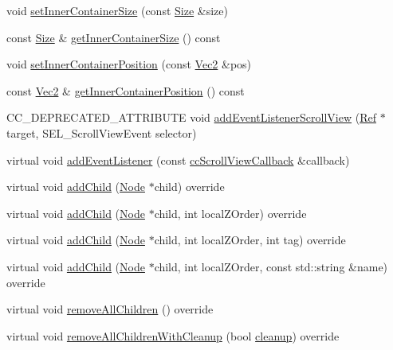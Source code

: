 \begin{DoxyCompactItemize}
\item 
void \hyperlink{classui_1_1ScrollView_a783880c25817f9bf15abc463e34ca413}{set\+Inner\+Container\+Size} (const \hyperlink{classSize}{Size} \&size)
\item 
const \hyperlink{classSize}{Size} \& \hyperlink{classui_1_1ScrollView_aa1767cb627e7d48b7f031e620d44f656}{get\+Inner\+Container\+Size} () const
\item 
void \hyperlink{classui_1_1ScrollView_a137ec6b7e449bebbb80e784965f6a859}{set\+Inner\+Container\+Position} (const \hyperlink{classVec2}{Vec2} \&pos)
\item 
const \hyperlink{classVec2}{Vec2} \& \hyperlink{classui_1_1ScrollView_ab8fdf3e895c799cf9d456c3fc62990a0}{get\+Inner\+Container\+Position} () const
\item 
C\+C\+\_\+\+D\+E\+P\+R\+E\+C\+A\+T\+E\+D\+\_\+\+A\+T\+T\+R\+I\+B\+U\+TE void \hyperlink{classui_1_1ScrollView_accb739c82acfb7dd0db5a33f68519356}{add\+Event\+Listener\+Scroll\+View} (\hyperlink{classRef}{Ref} $\ast$target, S\+E\+L\+\_\+\+Scroll\+View\+Event selector)
\item 
virtual void \hyperlink{classui_1_1ScrollView_ad8aeb3841d9330558f538d4aad679073}{add\+Event\+Listener} (const \hyperlink{classui_1_1ScrollView_ae836cc55536c3cc4f4db5cb99c3c88d5}{cc\+Scroll\+View\+Callback} \&callback)
\item 
virtual void \hyperlink{classui_1_1ScrollView_a6cdee934880e71245c6f5e6a2789c48a}{add\+Child} (\hyperlink{classNode}{Node} $\ast$child) override
\item 
virtual void \hyperlink{classui_1_1ScrollView_a42849e8b7b80ca0bcee880f40de9eccd}{add\+Child} (\hyperlink{classNode}{Node} $\ast$child, int local\+Z\+Order) override
\item 
virtual void \hyperlink{classui_1_1ScrollView_a1843e13af3409763de103e52eb28f3bd}{add\+Child} (\hyperlink{classNode}{Node} $\ast$child, int local\+Z\+Order, int tag) override
\item 
virtual void \hyperlink{classui_1_1ScrollView_a84baef5d2ad68df9c19a73da551a780d}{add\+Child} (\hyperlink{classNode}{Node} $\ast$child, int local\+Z\+Order, const std\+::string \&name) override
\item 
virtual void \hyperlink{classui_1_1ScrollView_aaef2d3ce7b1b7d485af4a3657bea17e5}{remove\+All\+Children} () override
\item 
virtual void \hyperlink{classui_1_1ScrollView_ac71d0fe89be6291abbccf6a6f8f011b4}{remove\+All\+Children\+With\+Cleanup} (bool \hyperlink{classProtectedNode_a5462a6202b458193c1881bcdcc5be78d}{cleanup}) override

\end{DoxyCompactItemize}
